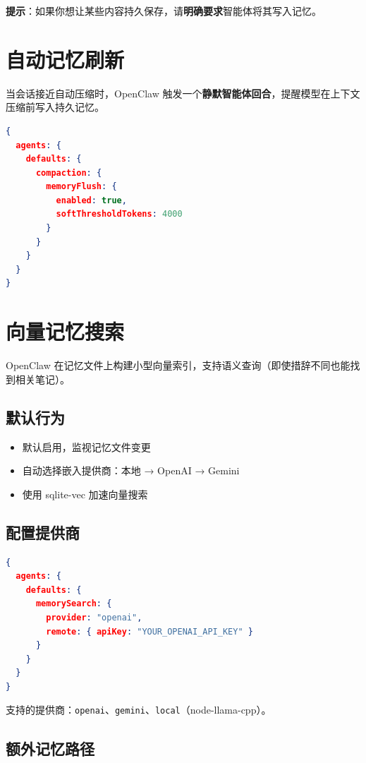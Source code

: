 \textbf{提示}：如果你想让某些内容持久保存，请\textbf{明确要求}智能体将其写入记忆。

\section{自动记忆刷新}

当会话接近自动压缩时，OpenClaw 触发一个\textbf{静默智能体回合}，提醒模型在上下文压缩前写入持久记忆。

\begin{lstlisting}[language=json]
{
  agents: {
    defaults: {
      compaction: {
        memoryFlush: {
          enabled: true,
          softThresholdTokens: 4000
        }
      }
    }
  }
}
\end{lstlisting}

\section{向量记忆搜索}

OpenClaw 在记忆文件上构建小型向量索引，支持语义查询（即使措辞不同也能找到相关笔记）。

\subsection{默认行为}

\begin{itemize}
  \item 默认启用，监视记忆文件变更
  \item 自动选择嵌入提供商：本地 → OpenAI → Gemini
  \item 使用 sqlite-vec 加速向量搜索
\end{itemize}

\subsection{配置提供商}

\begin{lstlisting}[language=json]
{
  agents: {
    defaults: {
      memorySearch: {
        provider: "openai",
        remote: { apiKey: "YOUR_OPENAI_API_KEY" }
      }
    }
  }
}
\end{lstlisting}

支持的提供商：\texttt{openai}、\texttt{gemini}、\texttt{local}（node-llama-cpp）。

\subsection{额外记忆路径}

